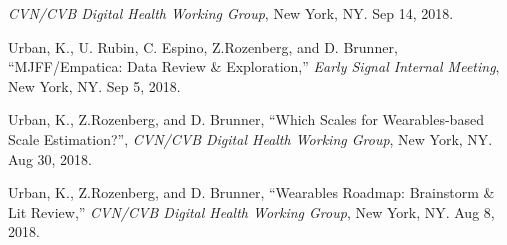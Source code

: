 \begin{itemize*}
    {\em CVN/CVB Digital Health Working Group},
    New York, NY. Sep 14, 2018.
  \item
    Urban, K., U. Rubin, C. Espino, Z.Rozenberg, and D. Brunner, 
    ``MJFF/Empatica: Data Review \& Exploration,''
    {\em Early Signal Internal Meeting},
    New York, NY. Sep 5, 2018.
  \item
    Urban, K., Z.Rozenberg, and D. Brunner, 
    ``Which Scales for Wearables-based Scale Estimation?'',
    {\em CVN/CVB Digital Health Working Group},
    New York, NY. Aug 30, 2018.
  \item
    Urban, K., Z.Rozenberg, and D. Brunner, 
    ``Wearables Roadmap: Brainstorm \& Lit Review,''
    {\em CVN/CVB Digital Health Working Group},
    New York, NY. Aug 8, 2018.
\end{itemize*}

